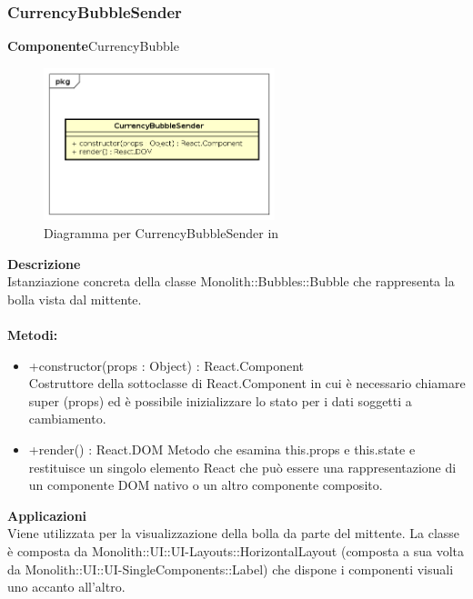 \subsubsection{CurrencyBubbleSender}
\textbf{Componente}CurrencyBubble\\
   \FloatBarrier
   \begin{figure}[ht]
   \centering
   \includegraphics[width=0.6\textwidth]{img/single-CurrencyBubbleSender}
   \caption{{Diagramma per CurrencyBubbleSender in }}
\end{figure}
\FloatBarrier
\textbf{Descrizione}\\
Istanziazione concreta della classe Monolith::Bubbles::Bubble che rappresenta la bolla vista dal mittente.
\\
\\
\textbf{Metodi:} 
\begin{itemize}
\item +constructor(props : Object) : React.Component 
\\
Costruttore della sottoclasse di React.Component in cui è necessario chiamare super (props) ed è possibile inizializzare lo stato per i dati soggetti a cambiamento.

\item +render() : React.DOM
Metodo che esamina this.props e this.state e restituisce un singolo elemento React che può essere una rappresentazione di un componente DOM nativo o un altro componente composito.

\end{itemize} 


\textbf{Applicazioni}\\
Viene utilizzata per la visualizzazione della bolla da parte del mittente.
La classe è composta da Monolith::UI::UI-Layouts::HorizontalLayout (composta a sua volta da Monolith::UI::UI-SingleComponents::Label) che dispone i componenti visuali uno accanto all'altro. 


\clearpage

